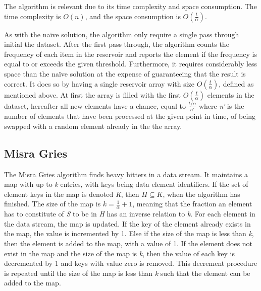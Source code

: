The algorithm is relevant due to its time complexity and space consumption. The time complexity is \(O(n)\), and the space consumption is \(O(\frac{t}{\alpha})\).

As with the naïve solution, the algorithm only require a single pass through initial the dataset. After the first pass through, the algorithm counts the frequency of each item in the reservoir and reports the element if the frequency is equal to or exceeds the given threshold.
Furthermore, it requires considerably less space than the naïve solution at the expense of guaranteeing that the result is correct. It does so by having a single reservoir array with size \(O(\frac{t}{\alpha})\), defined as mentioned above. At first the array is filled with the first \(O(\frac{t}{\alpha})\) elements in the dataset, hereafter all new elements have a chance, equal to \(\frac{t/\alpha}{n'}\) where \textit{n'} is the number of elements that have been processed at the given point in time,
 of being swapped with a random element already in the the array.





 
\subsection{Misra Gries}
The Misra Gries algorithm finds heavy hitters in a data stream. It maintains a map with up to \textit{k} entries, with keys being data element identifiers. If the set of element keys in the map is denoted \textit{K}, then \(H \subseteq K\), when the algorithm has finished. The size of the map is \(k = \frac{1}{\alpha} + 1\), meaning that the fraction an element has to constitute of \textit{S} to be in \textit{H} has an inverse relation to \textit{k}.
For each element in the data stream, the map is updated. If the key of the element already exists in the map, the value is incremented by 1. Else if the size of the map is less than \textit{k}, then the element is added to the map, with a value of 1. If the element does not exist in the map and the size of the map is \textit{k}, then the value of each key is decremented by 1 and keys with value zero is removed. This decrement procedure is repeated until the size of the map is less than \textit{k} such that the element can be added to the map.

